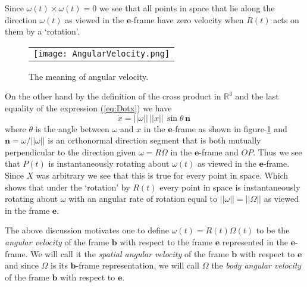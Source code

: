 \documentclass[graybox,envcountchap,sectrefs]{svmonoMuga}
\begin{document}
Since $\omega(t) \times \omega(t)=0$ we see that all points in space that lie along the direction $\omega(t)$ as viewed in the $\mathbf{e}$-frame have zero velocity when $R(t)$ acts on them by a `rotation'.
\begin{figure}[ht]
\begin{center}
\begin{tabular}{c}
\texttt{[image: AngularVelocity.png]} 
\end{tabular}
\renewcommand{\baselinestretch}{1}\selectfont
\caption{The meaning of angular velocity.}
\label{Fig:AngularVelocity}
\renewcommand{\baselinestretch}{1.5}\selectfont
\end{center}
\end{figure}
On the other hand by the definition of the cross product in $\mathbb{R}^3$ and the last equality of the expression (\ref{eq:Dotx}) we have
\[
\dot{x}=||\omega||\,||x||\,\sin{\theta}\,\mathbf{n} \,
\]
where $\theta$ is the angle between $\omega$ and $x$ in the $\mathbf{e}$-frame as shown in figure-\ref{Fig:AngularVelocity} and $\mathbf{n}=\omega/||\omega||$ is an orthonormal direction segment that is both mutually perpendicular to the direction given $\omega=R\Omega$ in the $\mathbf{e}$-frame and $OP$. 
Thus we see that $P(t)$ is instantaneously rotating about $\omega(t)$ as viewed in the $\mathbf{e}$-frame. Since $X$ was arbitrary we see that this is true for every point in space. Which shows that under the `rotation' by $R(t)$ every point in space is instantaneously rotating about $\omega$ with an angular rate of rotation equal to $||\omega||=||\Omega||$ as viewed in the frame $\mathbf{e}$. 
\begin{svgraybox}
The above discussion motivates one to define $\omega(t)=R(t)\Omega(t)$ to be the \textit{angular velocity} of the frame $\mathbf{b}$ with respect to the frame $\mathbf{e}$ represented in the $\mathbf{e}$-frame. We will call it the \textit{spatial angular velocity} of the frame $\mathbf{b}$ with respect to $\mathbf{e}$ and since $\Omega$ is its $\mathbf{b}$-frame representation, we will call $\Omega$ the \textit{body angular velocity} of the frame $\mathbf{b}$ with respect to $\mathbf{e}$.
\end{svgraybox}




\end{document}
